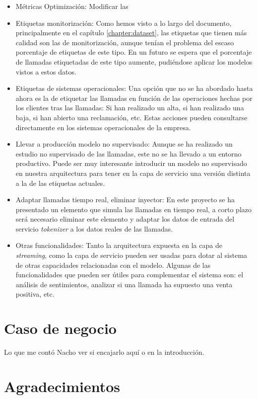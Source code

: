 \begin{itemize}
	\item Métricas Optimización: Modificar las 
	\item Etiquetas monitorización: Como hemos visto a lo largo del documento, principalmente en el capítulo \ref{chapter:dataset}, las etiquetas que tienen más calidad son las de monitorización, aunque tenían el problema del escaso porcentaje de etiquetas de este tipo. En un futuro se espera que el porcentaje de llamadas etiquetadas de este tipo aumente, pudiéndose aplicar los modelos vistos a estos datos.
	\item Etiquetas de sistemas operacionales: Una  opción que no se ha abordado hasta ahora es la de etiquetar las llamadas en función de las operaciones hechas por los clientes tras las llamadas: Si han realizado un alta, si han realizado una baja, si han abierto una reclamación, etc. Estas acciones pueden consultarse directamente en los sistemas operacionales de la empresa.
	\item Llevar a producción modelo no supervisado: Aunque se ha realizado un estudio no supervisado de las llamadas, este no se ha llevado a un entorno productivo. Puede ser muy interesante introducir un modelo no supervisado en nuestra arquitectura para tener en la capa de servicio una versión distinta a la de las etiquetas actuales. 
	\item Adaptar llamadas tiempo real, eliminar inyector: En este proyecto se ha presentado un elemento que simula las llamadas en tiempo real, a corto plazo será necesario eliminar este elemento y adaptar los datos de entrada del servicio \textit{tokenizer} a los datos reales de las llamadas. 
	\item Otras funcionalidades: Tanto la arquitectura expuesta en la capa de \textit{streaming}, como la capa de servicio pueden ser usadas para dotar al sistema de otras capacidades relacionadas con el modelo. Algunas de las funcionalidades que pueden ser útiles para complementar el sistema son: el análisis de sentimientos, analizar si una llamada ha supuesto una venta positiva, etc. 
\end{itemize}

\section{Caso de negocio}
Lo que me contó Nacho ver si encajarlo aquí o en la introducción. 

\section{Agradecimientos}



